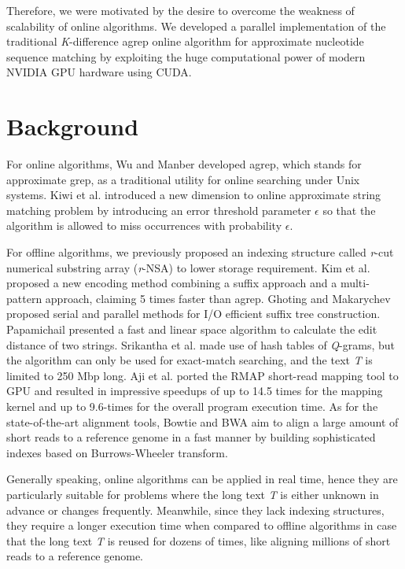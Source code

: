 Therefore, we were motivated by the desire to overcome the weakness of scalability of online algorithms. We developed a parallel implementation of  the traditional \textit{K}-difference agrep \citep{190-1992,451-1992} online algorithm for approximate nucleotide sequence matching by exploiting the huge computational power of modern NVIDIA GPU hardware using CUDA.

\section{Background}

For online algorithms, Wu and Manber \citep{190-1992,451-1992} developed agrep, which stands for approximate grep, as a traditional utility for online searching under Unix systems. Kiwi et al. \citep{703-2008} introduced a new dimension to online approximate string matching problem by introducing an error threshold parameter $\epsilon$ so that the algorithm is allowed to miss occurrences with probability $\epsilon$.

For offline algorithms, we \citep{197-2008} previously proposed an indexing structure called \textit{r}-cut numerical substring array (\textit{r}-NSA) to lower storage requirement. Kim et al. \citep{623-2007} proposed a new encoding method combining a suffix approach and a multi-pattern approach, claiming 5 times faster than agrep. Ghoting and Makarychev \citep{198-2009} proposed serial and parallel methods for I/O efficient suffix tree construction. Papamichail \citep{229-2009} presented a fast and linear space algorithm to calculate the edit distance of two strings. Srikantha et al. \citep{448-2010} made use of hash tables of \textit{Q}-grams, but the algorithm can only be used for exact-match searching, and the text \textit{T} is limited to 250 Mbp long. Aji et al. \citep{622-2010} ported the RMAP short-read mapping tool to GPU and resulted in impressive speedups of up to 14.5 times for the mapping kernel and up to 9.6-times for the overall program execution time. As for the state-of-the-art alignment tools, Bowtie \citep{450-2009} and BWA \citep{251-2009} aim to align a large amount of short reads to a reference genome in a fast manner by building sophisticated indexes based on Burrows-Wheeler transform.

Generally speaking, online algorithms can be applied in real time, hence they are particularly suitable for problems where the long text \textit{T} is either unknown in advance or changes frequently. Meanwhile, since they lack indexing structures, they require a longer execution time when compared to offline algorithms in case that the long text \textit{T} is reused for dozens of times, like aligning millions of short reads to a reference genome.

